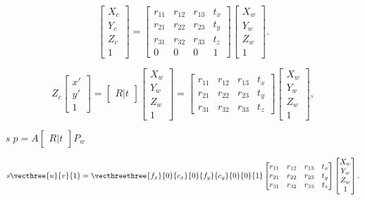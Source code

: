 \documentclass{article}
\begin{document}
\[\begin{bmatrix} X_c \\ Y_c \\ Z_c \\ 1 \end{bmatrix} = \begin{bmatrix} r_{11} & r_{12} & r_{13} & t_x \\ r_{21} & r_{22} & r_{23} & t_y \\ r_{31} & r_{32} & r_{33} & t_z \\ 0 & 0 & 0 & 1 \end{bmatrix} \begin{bmatrix} X_w \\ Y_w \\ Z_w \\ 1 \end{bmatrix}.\]
\pagebreak

\[Z_c \begin{bmatrix} x' \\ y' \\ 1 \end{bmatrix} = \begin{bmatrix} R|t \end{bmatrix} \begin{bmatrix} X_w \\ Y_w \\ Z_w \\ 1 \end{bmatrix} = \begin{bmatrix} r_{11} & r_{12} & r_{13} & t_x \\ r_{21} & r_{22} & r_{23} & t_y \\ r_{31} & r_{32} & r_{33} & t_z \end{bmatrix} \begin{bmatrix} X_w \\ Y_w \\ Z_w \\ 1 \end{bmatrix},\]
\pagebreak

$s \; p = A \begin{bmatrix} R|t \end{bmatrix} P_w$
\pagebreak

\[s \vecthree{u}{v}{1} = \vecthreethree{f_x}{0}{c_x}{0}{f_y}{c_y}{0}{0}{1} \begin{bmatrix} r_{11} & r_{12} & r_{13} & t_x \\ r_{21} & r_{22} & r_{23} & t_y \\ r_{31} & r_{32} & r_{33} & t_z \end{bmatrix} \begin{bmatrix} X_w \\ Y_w \\ Z_w \\ 1 \end{bmatrix}.\]
\pagebreak
\end{document}
